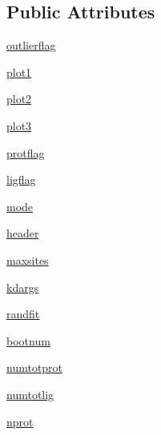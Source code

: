 \subsection*{Public Attributes}
\begin{DoxyCompactItemize}
\item 
\hyperlink{class_uni_dec_1_1unidec__modules_1_1_uni_fit_1_1_k_dmodel_a3fe61ca0646e94f92268662a0985bf2c}{outlierflag}
\item 
\hyperlink{class_uni_dec_1_1unidec__modules_1_1_uni_fit_1_1_k_dmodel_a76d9311b647a92b09eecac9670862afb}{plot1}
\item 
\hyperlink{class_uni_dec_1_1unidec__modules_1_1_uni_fit_1_1_k_dmodel_ab0856817a2ea9cbb7b380e36526eb228}{plot2}
\item 
\hyperlink{class_uni_dec_1_1unidec__modules_1_1_uni_fit_1_1_k_dmodel_a89b958e4fd161cde0597e92f91d37917}{plot3}
\item 
\hyperlink{class_uni_dec_1_1unidec__modules_1_1_uni_fit_1_1_k_dmodel_aa73fe7f3c477410445f80e2b106f5a7e}{protflag}
\item 
\hyperlink{class_uni_dec_1_1unidec__modules_1_1_uni_fit_1_1_k_dmodel_a727c611a18f94ecc707cde976bf7bada}{ligflag}
\item 
\hyperlink{class_uni_dec_1_1unidec__modules_1_1_uni_fit_1_1_k_dmodel_a5d6fdd2a29b9985eb262ab74812eca94}{mode}
\item 
\hyperlink{class_uni_dec_1_1unidec__modules_1_1_uni_fit_1_1_k_dmodel_ad358568cc86759b98301505e4269dca5}{header}
\item 
\hyperlink{class_uni_dec_1_1unidec__modules_1_1_uni_fit_1_1_k_dmodel_abc4d01c70a5db6f1fb92f1ccdab9e180}{maxsites}
\item 
\hyperlink{class_uni_dec_1_1unidec__modules_1_1_uni_fit_1_1_k_dmodel_a6564aaa91eda942de7f899417a01ff25}{kdargs}
\item 
\hyperlink{class_uni_dec_1_1unidec__modules_1_1_uni_fit_1_1_k_dmodel_a0662864143b97faba340c32f484e4270}{randfit}
\item 
\hyperlink{class_uni_dec_1_1unidec__modules_1_1_uni_fit_1_1_k_dmodel_a6d338faa2ada91c46c115a190d763bae}{bootnum}
\item 
\hyperlink{class_uni_dec_1_1unidec__modules_1_1_uni_fit_1_1_k_dmodel_a113f9a77d43be14a823859d3b26b5c21}{numtotprot}
\item 
\hyperlink{class_uni_dec_1_1unidec__modules_1_1_uni_fit_1_1_k_dmodel_a0be297c68426a79312ad1d31a9c9c170}{numtotlig}
\item 
\hyperlink{class_uni_dec_1_1unidec__modules_1_1_uni_fit_1_1_k_dmodel_a24af327f7c83c3997561c7dc4d4e4c8e}{nprot}

\end{DoxyCompactItemize}
